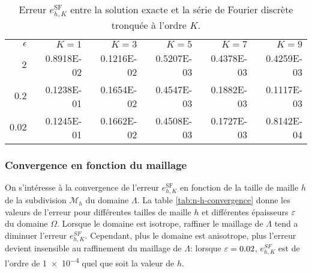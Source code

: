 \begin{table}[h!]
  \caption{Erreur $e_{h,K}^\mathrm{SF}$ entre la solution exacte et la
    série de Fourier discrète tronquée à l'ordre $K$.}
  \label{tab:h-k-convergence}
  \begin{center}
    \begin{tabular}{@{}rrrrrr@{}}
      \toprule
      $\epsilon$   & $K = 1$ & $K = 3$ & $K = 5$ & $K = 7$ & $K = 9$\\
      \cmidrule{1-6}
      $2$      & \num{0.8918E-02} & \num{0.1216E-02} & \num{0.5207E-03} & \num{0.4378E-03} & \num{0.4259E-03} \\
      $0.2$    & \num{0.1238E-01} & \num{0.1654E-02} & \num{0.4547E-03} & \num{0.1882E-03} & \num{0.1117E-03} \\
      $0.02$   & \num{0.1245E-01} & \num{0.1662E-02} & \num{0.4508E-03} & \num{0.1727E-03} & \num{0.8142E-04} \\
      \bottomrule
    \end{tabular}
  \end{center}
\end{table}


\subsubsection{Convergence en fonction du maillage}
On s'intéresse à la convergence de l'erreur $e_{h,K}^\mathrm{SF}$ en
fonction de la taille de maille $h$ de la subdivision $\mathcal M_h$
du domaine $\Lambda$. La table \ref{tab:n-h-convergence} donne les
valeurs de l'erreur pour différentes tailles de maille $h$ et
différentes épaisseurs $\varepsilon$ du domaine $\Omega$.  Lorsque le
domaine est isotrope, raffiner le maillage de $\Lambda$ tend a
diminuer l'erreur $e_{h, K}^{SF}$. Cependant, plus le domaine est
anisotrope, plus l'erreur devient insensible au raffinement du
maillage de $\Lambda$: lorsque $\varepsilon = \num{0.02}$,
$e_{h,K}^{SF}$ est de l'ordre de \num{1e-4} quel que soit la valeur de
$h$.

